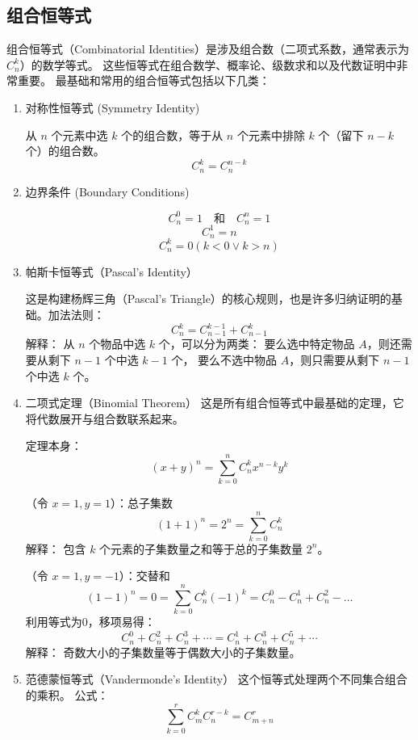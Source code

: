 \subsection{组合恒等式}
\label{sec:combine-identical-equation}
组合恒等式（Combinatorial Identities）是涉及组合数（二项式系数，通常表示为 \(C_n^k\)）的数学等式。
这些恒等式在组合数学、概率论、级数求和以及代数证明中非常重要。
最基础和常用的组合恒等式包括以下几类：
\begin{enumerate}
  \item 对称性恒等式 (Symmetry Identity)

    从 \(n\) 个元素中选 \(k\) 个的组合数，等于从 \(n\) 个元素中排除 \(k\) 个（留下 \(n-k\) 个）的组合数。
    \[C_n^k=C_n^{n-k}\]

   \item 边界条件 (Boundary Conditions)

     \[ C_n^0 = 1 \quad\textit{和}\quad C_n^n=1\]
     \[ C_n^1 = n \]
     \[ C_n^k = 0 (k<0 \lor k>n)\]

   \item 帕斯卡恒等式（Pascal's Identity）

     这是构建杨辉三角（Pascal's Triangle）的核心规则，也是许多归纳证明的基础。加法法则：
    \[C_n^k= C_{n-1}^{k-1} + C_{n-1}^k\]
    解释： 从 \(n\) 个物品中选 \(k\) 个，可以分为两类：
    要么选中特定物品 \(A\)，则还需要从剩下 \(n-1\) 个中选 \(k-1\) 个，
    要么不选中物品 \(A\)，则只需要从剩下 \(n-1\) 个中选 \(k\) 个。

  \item 二项式定理（Binomial Theorem）
    这是所有组合恒等式中最基础的定理，它将代数展开与组合数联系起来。

    定理本身：\[(x+y)^{n}=\sum _{k=0}^{n}{C_n^k}x^{n-k}y^{k}\]

    \begin{inference}
    （令 \(x=1,y=1\)）：总子集数
    \[(1+1)^{n}=2^{n}=\sum _{k=0}^{n}{C_n^k}\]
    解释： 包含 \(k\) 个元素的子集数量之和等于总的子集数量 \(2^{n}\)。
    \end{inference}

    \begin{inference}
     （令 \(x=1,y=-1\)）：交替和
    \[(1-1)^{n}=0=\sum _{k=0}^{n}{C_n^k}(-1)^{k}={C_n^0}-{C_n^1}+{C_n^2}-\dots \]
     利用等式为\(0\)，移项易得：
    \[ C_n^0 + C_n^2 + C_n^3 +  \cdots = C_n^1 + C_n^3 + C_n^5 + \cdots \]
    解释： 奇数大小的子集数量等于偶数大小的子集数量。
    \end{inference}

  \item 范德蒙恒等式（Vandermonde's Identity）
    这个恒等式处理两个不同集合组合的乘积。
    公式：\[\sum _{k=0}^{r}{C_m^k}{C_n^{r-k}}=C_{m+n}^r\]


\end{enumerate}
